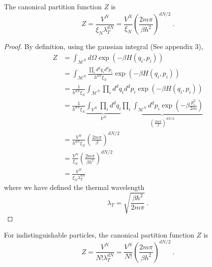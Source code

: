     The canonical partition function $Z$ is 
    \begin{equation*}
        Z = \frac{V^N}{\xi_N \lambda^{dN}_T} = \frac{V^N}{ \xi_N} (\frac{2 m \pi}{\beta h^2})^{dN/2} ~.
    \end{equation*}
    \begin{proof}
        By definition, using the gaussian integral (See appendix 3),
        \begin{equation*}
        \begin{aligned}
            Z & = \int_{\mathcal M^N} d\Omega \exp(- \beta H (q_i, p_i)) \\ & = \int_{\mathcal M^N} \frac{\prod_i d^d q_i d^d p_i}{h^{dN} \xi_N} \exp(- \beta H (q_i, p_i)) \\ & = \frac{1}{h^{dN} \xi_N} \int_{\mathcal M^N} \prod_i d^d q_i d^d p_i \exp(- \beta H (q_i, p_i)) \\ & = \frac{1}{h^{dN} \xi_N} \underbrace{\int_{ V^N} \prod_i d^d q_i}_{V^N} \underbrace{\prod_i \int_{\mathcal M^N} d^d p_i \exp(- \beta \frac{p^2_i}{2m})}_{(\frac{2 m \pi}{\beta})^{dN/2}} \\ & = \frac{V^N}{h^{dN} \xi_N} (\frac{2 m \pi}{\beta})^{dN/2} \\ & = \frac{V^N}{ \xi_N} (\frac{2 m \pi}{\beta h^2})^{dN/2} \\ & = \frac{V^N}{\xi_N \lambda^{dN}_T}
        \end{aligned}
        \end{equation*}
        where we have defined the thermal wavelength 
        \begin{equation*}
            \lambda_T = \sqrt{\frac{\beta h^2}{2 m \pi}} ~.
        \end{equation*}
    \end{proof}

    For indistinguishable particles, the canonical partition function $Z$ is 
    \begin{equation*}
        Z = \frac{V^N}{N! \lambda^{dN}_T} = \frac{V^N}{N!} (\frac{2 m \pi}{\beta h^2})^{dN/2} ~.
    \end{equation*}

